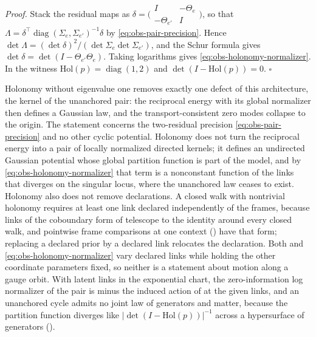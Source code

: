\noindent\emph{Proof.}
Stack the residual maps as
\(\delta=\bigl(\begin{smallmatrix}I&-\Theta_e\\-\Theta_{e'}&I\end{smallmatrix}\bigr)\), so that
\(\Lambda=\delta^\top\operatorname{diag}(\Sigma_e,\Sigma_{e'})^{-1}\delta\) by
\eqref{eq:obs-pair-precision}. Hence
\(\det\Lambda=(\det\delta)^2/(\det\Sigma_e\det\Sigma_{e'})\), and the Schur formula gives
\(\det\delta=\det(I-\Theta_{e'}\Theta_e)\). Taking logarithms gives
\eqref{eq:obs-holonomy-normalizer}. In the witness \(\mathrm{Hol}(p)=\operatorname{diag}(1,2)\) and
\(\det(I-\mathrm{Hol}(p))=0\). \hfill$\square$

\medskip
Holonomy without eigenvalue one removes exactly one defect of this architecture, the
kernel of the unanchored pair: the reciprocal energy with its global normalizer then
defines a Gaussian law, and the transport-consistent zero modes collapse to the origin.
The statement concerns the two-residual precision \eqref{eq:obs-pair-precision} and no other
cyclic potential. Holonomy does not turn the reciprocal energy into a pair of locally
normalized directed kernels; it defines an undirected Gaussian potential whose global
partition function is part of the model, and by \eqref{eq:obs-holonomy-normalizer} that term
is a nonconstant function of the links that diverges on the singular locus, where the
unanchored law ceases to exist. Holonomy also does not remove declarations. A closed walk
with nontrivial holonomy requires at least one link declared independently of the frames,
because links of the coboundary form of  telescope to
the identity around every closed walk, and pointwise frame comparisons at one context
() have that form; replacing a declared prior by a declared link
relocates the declaration. Both  and
\eqref{eq:obs-holonomy-normalizer} vary declared links while holding the other coordinate
parameters fixed, so neither is a statement about motion along a gauge orbit. With latent links in
the exponential chart, the zero-information log normalizer of the pair is minus the induced action of
 at the given links, and an unanchored cycle admits no joint law of
generators and matter, because the partition function diverges like
\(\lvert\det(I-\mathrm{Hol}(p))\rvert^{-1}\) across a hypersurface of generators
().

